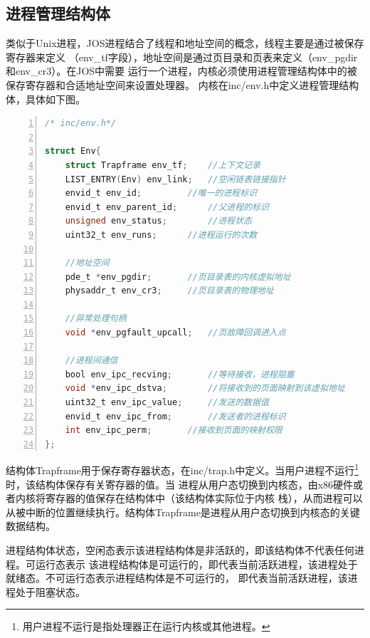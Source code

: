 \documentclass[12pt,openany,a4paper]{report}
\begin{document}
	\subsection{进程管理结构体}
	类似于Unix进程，JOS进程结合了线程和地址空间的概念，线程主要是通过被保存寄存器来定义
	（env\_tf字段），地址空间是通过页目录和页表来定义（env\_pgdir和env\_cr3）。在JOS中需要
	运行一个进程，内核必须使用进程管理结构体中的被保存寄存器和合适地址空间来设置处理器。
	内核在inc/env.h中定义进程管理结构体，具体如下图。\par
		\begin{lstlisting}[language=C,numbers=left,numberstyle=\tiny,keywordstyle=\color{blue},frame=shadowbox,rulesepcolor=\color{red!20!green!20!blue!20},commentstyle=\color{red!50!green!50!blue!50!}\selectfont,basicstyle=\ttfamily\fontsize{8}{8}\selectfont]
/* inc/env.h*/

struct Env{
	struct Trapframe env_tf;	//上下文记录
	LIST_ENTRY(Env) env_link;	//空闲链表链接指针
	envid_t env_id;			//唯一的进程标识
	envid_t env_parent_id;		//父进程的标识
	unsigned env_status;		//进程状态
	uint32_t env_runs;		//进程运行的次数
	
	//地址空间
	pde_t *env_pgdir;		//页目录表的内核虚拟地址
	physaddr_t env_cr3;		//页目录表的物理地址

	//异常处理句柄
	void *env_pgfault_upcall;	//页故障回调进入点

	//进程间通信
	bool env_ipc_recving;		//等待接收，进程阻塞
	void *env_ipc_dstva;		//将接收到的页面映射到该虚拟地址
	uint32_t env_ipc_value;		//发送的数据值
	envid_t env_ipc_from;		//发送者的进程标识
	int env_ipc_perm;		//接收到页面的映射权限
};

		\end{lstlisting}

	    结构体Trapframe用于保存寄存器状态，在inc/trap.h中定义。当用户进程不运行\footnote{
	用户进程不运行是指处理器正在运行内核或其他进程。} 时，该结构体保存有关寄存器的值。当
	进程从用户态切换到内核态，由x86硬件或者内核将寄存器的值保存在结构体中（该结构体实际位于内核
	栈），从而进程可以从被中断的位置继续执行。结构体Trapframe是进程从用户态切换到内核态的关键
	数据结构。\par
	    进程结构体状态，空闲态表示该进程结构体是非活跃的，即该结构体不代表任何进程。可运行态表示
	该进程结构体是可运行的，即代表当前活跃进程，该进程处于就绪态。不可运行态表示进程结构体是不可运行的，
	即代表当前活跃进程，该进程处于阻塞状态。\par
\end{document}
